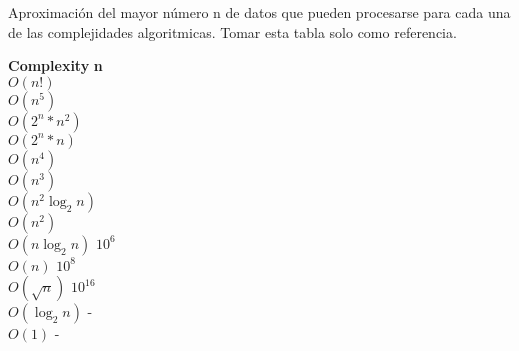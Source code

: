 Aproximación del mayor número n de datos que pueden procesarse para cada una de las complejidades algoritmicas. Tomar esta tabla solo como referencia.

\begin{tabbing}
\textbf{Complexity}\hspace{4cm} \=  \textbf{n}\hspace{3cm}   \\ 
$O(n!)$ \\ 
$O(n^{5})$ \\ 
$O(2^{n}*n^{2})$ \\ 
$O(2^{n}*n)$ \\ 
$O(n^{4})$ \\ 
$O(n^{3})$ \\ 
$O(n^{2}\log_{2}n)$ \\ 
$O(n^{2})$ \\ 
$O(n\log_{2}n)$ \> $10^{6}$\\ 
$O(n)$ \> $10^{8}$\\ 
$O(\sqrt{n})$ \> $10^{16}$\\ 
$O(\log_{2}n)$ \> -\\ 
$O(1)$ \> -\\ 
\end{tabbing}
